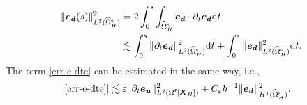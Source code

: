 \documentclass[11pt,reqno]{amsart}
\theoremstyle{definition}
\theoremstyle{plain}
\numberwithin{theorem}{section}
\numberwithin{proposition}{section}
\numberwithin{lemma}{section}
\numberwithin{equation}{section}
\newcommand{\bs}[1]{\boldsymbol{#1}}
\newcommand{\uu}[1]  {{\bs{#1}} }
\newcommand{\grad}   { \uu{\nabla}    }
\def\d{\mathrm{d}}
\renewcommand{\(}{\bigl(}
\renewcommand{\)}{\bigr)}
\begin{document}
\begin{align}
\|{\bs e}_{\bs d}(s)\|_{L^2(\widehat\Omega^{\rm s}_H)}^2
&= 2\int_0^s \int_{\widehat\Omega^{\rm s}_H} {\bs e}_{\bs d} \cdot \partial_t{\bs e}_{\bs d} \d t \notag\\ 
&\lesssim \int_0^s \|\partial_t{\bs e}_{\bs d}\|_{L^2(\widehat\Omega^{\rm s}_H)}^2 \d t 
+ \int_0^s \|{\bs e}_{\bs d}\|_{L^2(\widehat\Omega^{\rm s}_H)}^2 \d t . 
\end{align}
The term \eqref{err-e-dte} can be estimated in the same way, i.e., 
\begin{align}\label{estimate-err-e-dte}
|\eqref{err-e-dte}|
&\lesssim \varepsilon\|\partial_{t}{\bs e}_{\bs u}\|_{L^2(\Omega^{\rm f}[\bs X_H])}^2 
+C_{\varepsilon}h^{-1}\|{\bs e}_{\bs d}\|_{H^1(\widehat\Omega^{\rm s}_H)}^2 .
\end{align}
\end{document}
